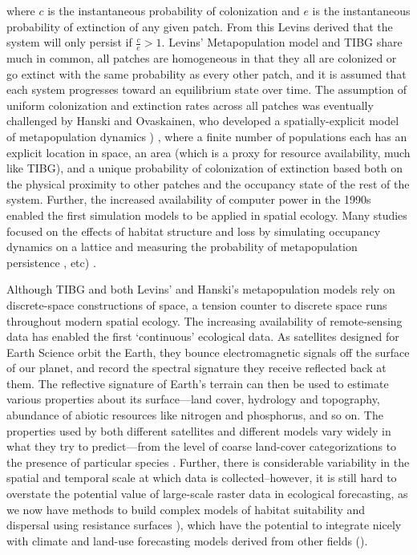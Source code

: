 \documentclass[]{article}
\begin{document}
where \(c\) is the instantaneous probability of colonization and \(e\)
is the instantaneous probability of extinction of any given patch. From
this Levins derived that the system will only persist if
\(\frac{c}{e} > 1\). Levins' Metapopulation model and TIBG share much in
common, all patches are homogeneous in that they all are colonized or go
extinct with the same probability as every other patch, and it is
assumed that each system progresses toward an equilibrium state over
time. The assumption of uniform colonization and extinction rates across
all patches was eventually challenged by Hanski and Ovaskainen, who
developed a spatially-explicit model of metapopulation dynamics
\citep{hanski_practical_1994}) , where a finite number of populations each has
an explicit location in space, an area (which is a proxy for resource
availability, much like TIBG), and a unique probability of colonization
of extinction based both on the physical proximity to other patches and
the occupancy state of the rest of the system. Further, the increased
availability of computer power in the 1990s enabled the first simulation
models to be applied in spatial ecology. Many studies focused on the
effects of habitat structure and loss by simulating occupancy dynamics
on a lattice and measuring the probability of metapopulation persistence
\citep{bascompte_habitat_1996}, etc) .

Although TIBG and both Levins' and Hanski's metapopulation models rely
on discrete-space constructions of space, a tension counter to discrete
space runs throughout modern spatial ecology. The increasing
availability of remote-sensing data has enabled the first `continuous'
ecological data. As satellites designed for Earth Science orbit the
Earth, they bounce electromagnetic signals off the surface of our
planet, and record the spectral signature they receive reflected back at
them. The reflective signature of Earth's terrain can then be used to
estimate various properties about its surface---land cover, hydrology
and topography, abundance of abiotic resources like nitrogen and
phosphorus, and so on. The properties used by both different satellites
and different models vary widely in what they try to predict---from the
level of coarse land-cover categorizations to the presence of particular
species \citep{cite}. Further, there is considerable variability in the spatial and temporal scale at which data is collected--however, it is still hard to
overstate the potential value of large-scale raster data in ecological
forecasting, as we now have methods to build complex models of habitat
suitability and dispersal using resistance surfaces \citep{cite}),
which have the potential to integrate nicely with climate and land-use
forecasting models derived from other fields (\cite{dietze}).
\end{document}
